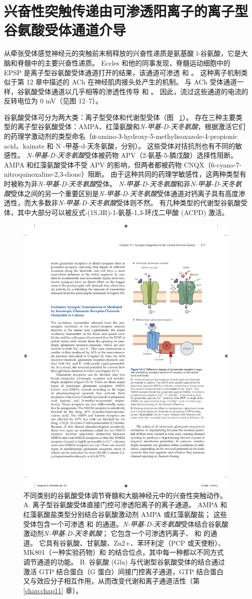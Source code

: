 \section{兴奋性突触传递由可渗透阳离子的离子型谷氨酸受体通道介导}

从牵张受体感觉神经元的突触前末梢释放的兴奋性递质是氨基酸 l-谷氨酸，它是大脑和脊髓中的主要兴奋性递质。
Eccles 和他的同事发现，脊髓运动细胞中的 EPSP 是离子型谷氨酸受体通道打开的结果，该通道可渗透  和 。
这种离子机制类似于第 12 章中描述的 ACh 在神经肌肉接头处产生的机制。
与 ACh 受体通道一样，谷氨酸受体通道以几乎相等的渗透性传导  和 。 因此，流过这些通道的电流的反转电位为 0 mV（见图 12–7）。


谷氨酸受体可分为两大类：离子型受体和代谢型受体（图 ~\ref{fig:13_3}）。 
存在三种主要类型的离子型谷氨酸受体：AMPA、红藻氨酸和\textit{N-甲基-D-天冬氨酸}，根据激活它们的药理学激动剂的类型命名（α-amino-3-hydroxy-5-methylisoxazole-4-propionic acid、kainate 和 N -甲基-d-天冬氨酸，分别）。
这些受体对拮抗剂也有不同的敏感性。
\textit{N-甲基-D-天冬氨酸}受体被药物 APV（2-氨基-5-膦戊酸）选择性阻断。
AMPA 和红藻氨酸受体不受 APV 的影响，但两者都被药物 CNQX（6-cyano-7-nitroquinoxaline-2,3-dione）阻断。
由于这种共同的药理学敏感性，这两种类型有时被称为非\textit{N-甲基-D-天冬氨酸}受体。
\textit{N-甲基-D-天冬氨酸}和非\textit{N-甲基-D-天冬氨酸}受体之间的另一个重要区别是\textit{N-甲基-D-天冬氨酸}受体通道对钙离子具有高度渗透性，而大多数非\textit{N-甲基-D-天冬氨酸}受体则不然。
有几种类型的代谢型谷氨酸受体，其中大部分可以被反式-(1S,3R)-1-氨基-1,3-环戊二甲酸 (ACPD) 激活。


\begin{figure}[htbp]
	\centering
	\includegraphics[width=0.5\linewidth]{chap13/fig_13_3}
	\caption{不同类别的谷氨酸受体调节脊髓和大脑神经元中的兴奋性突触动作。 A. 离子型谷氨酸受体直接门控可渗透阳离子的离子通道。 AMPA 和红藻氨酸盐类型分别结合谷氨酸激动剂 AMPA 或红藻氨酸盐； 这些受体包含一个可渗透  和  的通道。\textit{N-甲基-D-天冬氨酸}受体结合谷氨酸激动剂\textit{N-甲基-D-天冬氨酸}； 它包含一个可渗透钙离子、 和  的通道。 它具有谷氨酸、甘氨酸、Zn2+、苯环利定（PCP 或天使粉）、MK801（一种实验药物）和  的结合位点，其中每一种都以不同方式调节通道的功能。 B. 谷氨酸 (Glu) 与代谢型谷氨酸受体的结合通过激活 GTP 结合蛋白（G 蛋白）间接门控离子通道，GTP 结合蛋白又与效应分子相互作用，从而改变代谢和离子通道活性（第 \ref{chap:chap11} 章）。}
	\label{fig:13_3}
\end{figure}


